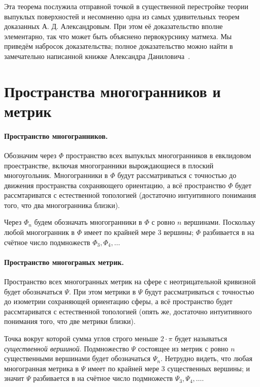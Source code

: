 \documentclass[oneside,a4paper]{article}
\begin{document}
Эта теорема послужила отправной точкой в существенной перестройке теории выпуклых поверхностей и несомненно одна из самых удивительных теорем доказанных А. Д. Александровым.
При этом её доказательство вполне элементарно, так что может быть объяснено первокурснику матмеха.
Мы приведём набросок доказательства; полное доказательство можно найти в замечательно написанной книжке Александра Даниловича~\cite{alexandrov}.


\section{Пространства многогранников и метрик}

\paragraph{Пространство многогранников.}
Обозначим через $\Phi$ пространство всех выпуклых многогранников в евклидовом проестранстве, включая многогранники вырождающиеся в плоский многоугольник.
Многогранники в $\Phi$ будут рассматриваться с точностью до движения пространства сохраняющего ориентацию, а всё пространство $\Phi$ будет рассмтариватся с естественной топологией (достаточно интуитивного понимания того, что два многогранника близки).

Через $\Phi_n$ будем обозначать многогранники в $\Phi$ с ровно $n$ вершинами.
Поскольку любой многогранник в $\Phi$ имеет по крайней мере 3 вершины;
$\Phi$ разбивается в на счётное число подмножеств $\Phi_3,\Phi_4,\dots$

\paragraph{Пространство многограных метрик.}
Пространство всех многогранных метрик на сфере с неотрицательной кривизной будет обозначаться $\Psi$.
При этом метрики в $\Psi$ будут рассматриваться с точностью до изометрии сохраняющей ориентацию сферы, а всё пространство будет рассмтариватся с естественной топологией (опять же, достаточно интуитивного понимания того, что две метрики близки).

Точка вокруг которой сумма углов строго меньше $2\cdot\pi$ будет называться \emph{существенной вершиной}.
Подмножество $\Psi$ состоящее из метрик с ровно $n$ существенными вершинами будет обозначаться $\Psi_n$.
Нетрудно видеть, что любая многогранная метрика в $\Psi$ имеет по крайней мере 3 существенных вершины;
и значит $\Psi$ разбивается в на счётное число подмножеств $\Psi_3,\Psi_4,\dots$.
\end{document}
